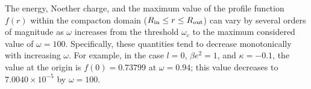 \documentclass[aps,prd,superscriptaddress,notitlepage,11pt,final,longbibliography,nofootinbib]{revtex4-1}
\numberwithin{equation}{section}
\begin{document}






The energy, Noether charge, and the maximum value of the profile function $f(r)$ within the compacton domain ($R_{\rm in} \leq r \leq R_{\rm out}$) can vary by several orders of magnitude as $\omega$ increases from the threshold $\omega_c$ to the maximum considered value of $\omega = 100$. Specifically, these quantities tend to decrease monotonically with increasing $\omega$. For example, in the case $l=0$, $\beta e^2=1$, and $\kappa = -0.1$, the value at the origin is $f(0) = 0.73799$ at $\omega = 0.94$; this value decreases to $7.0040 \times 10^{-5}$ by $\omega = 100$.
\end{document}
